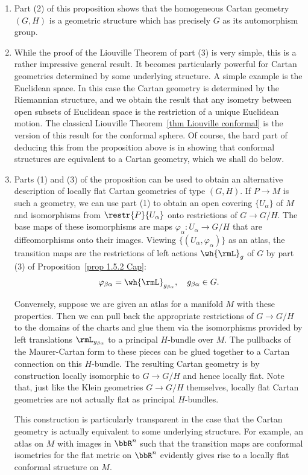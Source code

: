 \begin{rem}\label{rem 1.5.2 Cap}
    \begin{enumerate}
        \item Part (2) of this proposition shows that the homogeneous Cartan geometry $(G,H)$ is a geometric structure which has precisely $G$ as its automorphism group.
        \item While the proof of the Liouville Theorem of part (3) is very simple, this is a rather impressive general result. It becomes particularly powerful for Cartan geometries determined by some underlying structure. A simple example is the Euclidean space. In this case the Cartan geometry is determined by the Riemannian structure, and we obtain the result that any isometry between open subsets of Euclidean space is the restriction of a unique Euclidean motion. The classical Liouville Theorem~\ref{thm Liouville conformal} is the version of this result for the conformal sphere. Of course, the hard part of deducing this from the proposition above is in showing that conformal structures are equivalent to a Cartan geometry, which we shall do below.
        
        \item Parts (1) and (3) of the proposition can be used to obtain an alternative description of locally flat Cartan geometries of type $(G,H)$. If $P\to M$ is such a geometry, we can use part (1) to obtain an open covering $\{U_\alpha\}$ of $M$ and isomorphisms from $\restr{P}{U_\alpha}$ onto restrictions of $G\to G\slash H$. The base maps of these isomorphisms are maps $\varphi_\alpha:U_\alpha\to G\slash H$ that are diffeomorphisms onto their images. Viewing $\{(U_\alpha,\varphi_\alpha)\}$ as an atlas, the transition maps are the restrictions of left actions $\wh{\rmL}_g$ of $G$ by part (3) of Proposition~\ref{prop 1.5.2 Cap}:
        \[\varphi_{\beta\alpha}=\wh{\rmL}_{g_{\beta\alpha}},\quad g_{\beta\alpha}\in G.\]
        
        Conversely, suppose we are given an atlas for a manifold $M$ with these properties. Then we can pull back the appropriate restrictions of $G\to G\slash H$ to the domains of the charts and glue them via the isomorphisms provided by left translations $\rmL_{g_{\beta\alpha}}$ to a principal $H$-bundle over $M$. The pullbacks of the Maurer-Cartan form to these pieces can be glued together to a Cartan connection on this $H$-bundle. The resulting Cartan geometry is by construction locally isomorphic to $G\to G\slash H$ and hence locally flat. Note that, just like the Klein geometries $G\to G\slash H$ themselves, locally flat Cartan geometries are not actually flat as principal $H$-bundles.

        This construction is particularly transparent in the case that the Cartan geometry is actually equivalent to some underlying structure. For example, an atlas on $M$ with images in $\bbR^n$ such that the transition maps are conformal isometries for the flat metric on $\bbR^n$ evidently gives rise to a locally flat conformal structure on $M$.
    \end{enumerate}
\end{rem}







